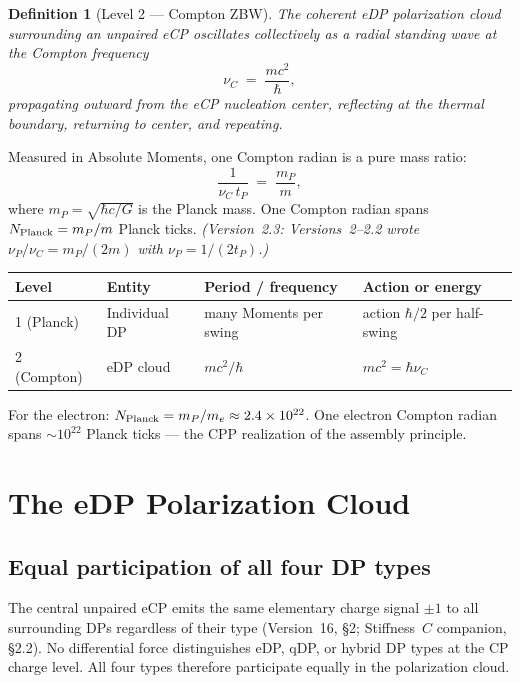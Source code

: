 \documentclass[12pt]{article}
\newtheorem{definition}[theorem]{Definition}
\newcommand{\tP}{t_P}
\newcommand{\mP}{m_P}
\newcommand{\nuP}{\nu_P}
\newcommand{\nuC}{\nu_C}
\begin{document}
\begin{definition}[Level 2 --- Compton ZBW]
The coherent eDP polarization cloud surrounding an unpaired eCP oscillates
collectively as a radial standing wave at the Compton frequency
\begin{equation}
  \nuC \;=\; \frac{mc^2}{\hbar},
  \label{eq:nu-compton}
\end{equation}
propagating outward from the eCP nucleation center, reflecting at the
thermal boundary, returning to center, and repeating.
\end{definition}

Measured in Absolute Moments, one Compton radian is a pure mass ratio:
\begin{equation}
  \frac{1}{\nuC\,\tP} \;=\; \frac{\mP}{m},
  \label{eq:ratio}
\end{equation}
where $\mP = \sqrt{\hbar c/G}$ is the Planck mass.  One Compton radian spans
$N_{\rm Planck} = \mP/m$ Planck ticks.  \emph{(Version~2.3: Versions~2--2.2
wrote $\nuP/\nuC = \mP/(2m)$ with $\nuP = 1/(2\tP)$.)}

\begin{center}
\renewcommand{\arraystretch}{1.4}
\begin{tabular}{@{}llll@{}}
\toprule
Level & Entity & Period / frequency & Action or energy \\
\midrule
1 (Planck) & Individual DP & many Moments per swing & action $\hbar/2$ per half-swing \\
2 (Compton) & eDP cloud & $mc^2/\hbar$ & $mc^2 = \hbar\nuC$ \\
\bottomrule
\end{tabular}
\end{center}

For the electron: $N_{\rm Planck} = \mP/m_e \approx 2.4\times10^{22}$.
One electron Compton radian spans $\sim10^{22}$ Planck
ticks --- the CPP realization of the assembly principle.

\section{The eDP Polarization Cloud}
\label{sec:cloud}

\subsection{Equal participation of all four DP types}

The central unpaired eCP emits the same elementary charge signal $\pm1$ to
all surrounding DPs regardless of their type (Version~16, \S2; Stiffness~$C$
companion, \S2.2).  No differential force distinguishes eDP, qDP, or hybrid
DP types at the CP charge level.  All four types therefore participate
equally in the polarization cloud.
\end{document}
